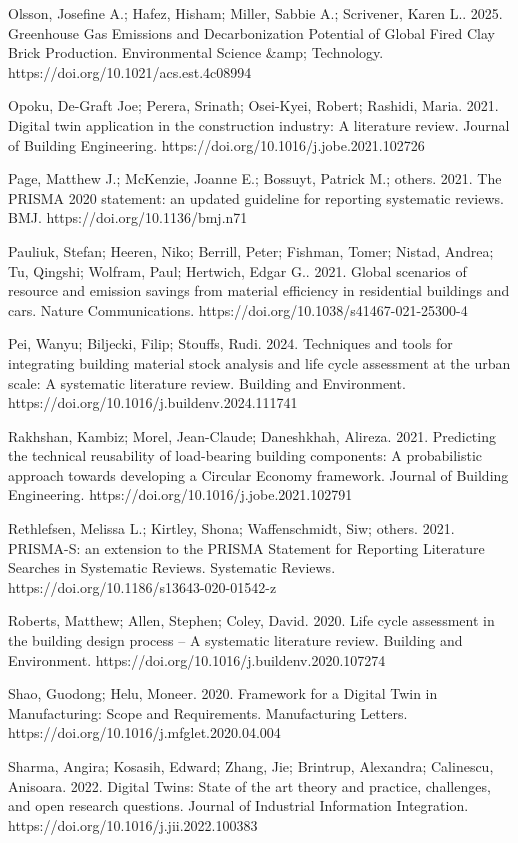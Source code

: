 Olsson, Josefine A.; Hafez, Hisham; Miller, Sabbie A.; Scrivener, Karen L.. 2025. Greenhouse Gas Emissions and Decarbonization Potential of Global Fired Clay Brick Production. Environmental Science \&amp; Technology. https://doi.org/10.1021/acs.est.4c08994

Opoku, De-Graft Joe; Perera, Srinath; Osei-Kyei, Robert; Rashidi, Maria. 2021. Digital twin application in the construction industry: A literature review. Journal of Building Engineering. https://doi.org/10.1016/j.jobe.2021.102726

Page, Matthew J.; McKenzie, Joanne E.; Bossuyt, Patrick M.; others. 2021. The PRISMA 2020 statement: an updated guideline for reporting systematic reviews. BMJ. https://doi.org/10.1136/bmj.n71

Pauliuk, Stefan; Heeren, Niko; Berrill, Peter; Fishman, Tomer; Nistad, Andrea; Tu, Qingshi; Wolfram, Paul; Hertwich, Edgar G.. 2021. Global scenarios of resource and emission savings from material efficiency in residential buildings and cars. Nature Communications. https://doi.org/10.1038/s41467-021-25300-4

Pei, Wanyu; Biljecki, Filip; Stouffs, Rudi. 2024. Techniques and tools for integrating building material stock analysis and life cycle assessment at the urban scale: A systematic literature review. Building and Environment. https://doi.org/10.1016/j.buildenv.2024.111741

Rakhshan, Kambiz; Morel, Jean-Claude; Daneshkhah, Alireza. 2021. Predicting the technical reusability of load-bearing building components: A probabilistic approach towards developing a Circular Economy framework. Journal of Building Engineering. https://doi.org/10.1016/j.jobe.2021.102791

Rethlefsen, Melissa L.; Kirtley, Shona; Waffenschmidt, Siw; others. 2021. PRISMA-S: an extension to the PRISMA Statement for Reporting Literature Searches in Systematic Reviews. Systematic Reviews. https://doi.org/10.1186/s13643-020-01542-z

Roberts, Matthew; Allen, Stephen; Coley, David. 2020. Life cycle assessment in the building design process -- A systematic literature review. Building and Environment. https://doi.org/10.1016/j.buildenv.2020.107274

Shao, Guodong; Helu, Moneer. 2020. Framework for a Digital Twin in Manufacturing: Scope and Requirements. Manufacturing Letters. https://doi.org/10.1016/j.mfglet.2020.04.004

Sharma, Angira; Kosasih, Edward; Zhang, Jie; Brintrup, Alexandra; Calinescu, Anisoara. 2022. Digital Twins: State of the art theory and practice, challenges, and open research questions. Journal of Industrial Information Integration. https://doi.org/10.1016/j.jii.2022.100383

